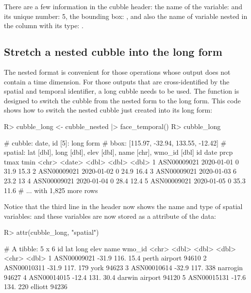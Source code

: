 \documentclass[
]{jss}
\begin{document}
There are a few information in the cubble header: the name of the  variable:  and its unique number: 5, the bounding box: \code{[115.97, -32.94, 133.55, -12.42]} , and also the name of variable nested in the  column with its type: .

\hypertarget{stretch-a-nested-cubble-into-the-long-form}{%
\subsection{Stretch a nested cubble into the long form}\label{stretch-a-nested-cubble-into-the-long-form}}

The nested format is convenient for those operations whose output does not contain a time dimension. For those outputs that are cross-identified by the spatial and temporal identifier, a long cubble needs to be used. The function  is designed to switch the cubble from the nested form to the long form. This code shows how to switch the nested cubble just created into its long form:

\begin{CodeChunk}
\begin{CodeInput}
R> cubble_long <- cubble_nested |> face_temporal()
R> cubble_long
\end{CodeInput}
\begin{CodeOutput}
# cubble:  date, id [5]: long form
# bbox:    [115.97, -32.94, 133.55, -12.42]
# spatial: lat [dbl], long [dbl], elev [dbl], name [chr], wmo_id [dbl]
  id          date        prcp  tmax  tmin
  <chr>       <date>     <dbl> <dbl> <dbl>
1 ASN00009021 2020-01-01     0  31.9  15.3
2 ASN00009021 2020-01-02     0  24.9  16.4
3 ASN00009021 2020-01-03     6  23.2  13  
4 ASN00009021 2020-01-04     0  28.4  12.4
5 ASN00009021 2020-01-05     0  35.3  11.6
# ... with 1,825 more rows
\end{CodeOutput}
\end{CodeChunk}

Notice that the third line in the header now shows the name and type of spatial variables:  and these variables are now stored as a  attribute of the data:

\begin{CodeChunk}
\begin{CodeInput}
R> attr(cubble_long, "spatial")
\end{CodeInput}
\begin{CodeOutput}
# A tibble: 5 x 6
  id            lat  long  elev name           wmo_id
  <chr>       <dbl> <dbl> <dbl> <chr>           <dbl>
1 ASN00009021 -31.9  116.  15.4 perth airport   94610
2 ASN00010311 -31.9  117. 179   york            94623
3 ASN00010614 -32.9  117. 338   narrogin        94627
4 ASN00014015 -12.4  131.  30.4 darwin airport  94120
5 ASN00015131 -17.6  134. 220   elliott         94236
\end{CodeOutput}
\end{CodeChunk}
\end{document}
